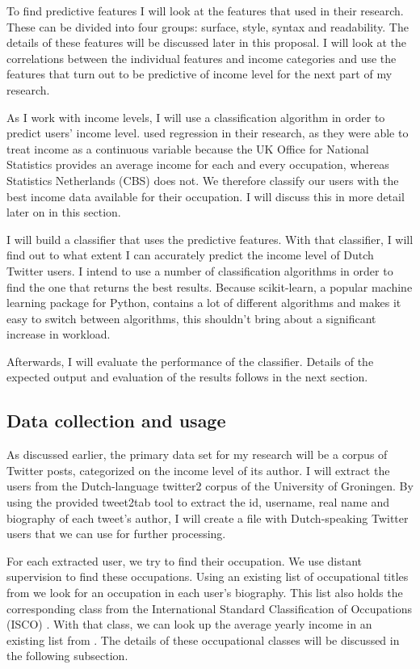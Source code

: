 \documentclass[11pt, a4paper]{article}
\begin{document}
To find predictive features I will look at the features that \citet{flekova} used in their research. These can be divided into four groups: surface, style, syntax and readability.  The details of these features will be discussed later in this proposal. I will look at the correlations between the individual features and income categories and use the features that turn out to be predictive of income level for the next part of my research.

As I work with income levels, I will use a classification algorithm in order to predict users' income level. \citet{flekova} used regression in their research, as they were able to treat income as a continuous variable because the UK Office for National Statistics provides an average income for each and every occupation, whereas Statistics Netherlands (CBS) does not.  We therefore classify our users with the best income data available for their occupation. I will discuss this in more detail later on in this section.

I will build a classifier that uses the predictive features. With that classifier, I will find out to what extent I can accurately predict the income level of Dutch Twitter users. I intend to use a number of classification algorithms in order to find the one that returns the best results. Because scikit-learn, a popular machine learning package for Python, contains a lot of different algorithms and makes it easy to switch between algorithms, this shouldn't bring about a significant increase in workload.

Afterwards, I will evaluate the performance of the classifier. Details of the expected output and evaluation of the results follows in the next section.

\subsection{Data collection and usage}
As discussed earlier, the primary data set for my research will be a corpus of Twitter posts, categorized on the income level of its author. I will extract the users from the Dutch-language twitter2 corpus of the University of Groningen. By using the provided tweet2tab tool to extract the id, username, real name and biography of each tweet's author, I will create a file with Dutch-speaking Twitter users that we can use for further processing. 

For each extracted user, we try to find their occupation. We use distant supervision to find these occupations. Using an existing list of occupational titles from \cite{codelijsten} we look for an occupation in each user's biography. This list also holds the corresponding class from the International Standard Classification of Occupations (ISCO) \citep{isco}.  With that class, we can look up the average yearly income in an existing list from \cite{uurlonen}. The details of these occupational classes will be discussed in the following subsection.
\end{document}

